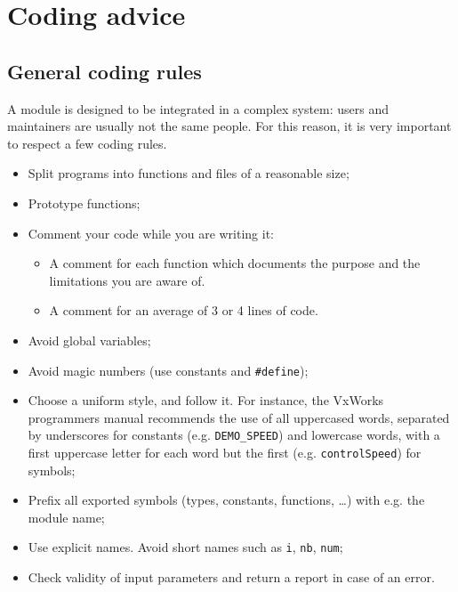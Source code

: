 \section{Coding advice}

\subsection{General coding rules}

A  module is designed  to be  integrated in a  complex system:  users and
maintainers are usually not the same people.  For this reason, it is very
important to respect a few coding rules.

\begin{itemize}
\item Split programs into functions and files of a reasonable size;

\item Prototype functions;

\item Comment your code while you are writing it: 
   \begin{itemize}
   \item A comment for each function which documents the purpose and the
	 limitations you are aware of.
   \item A comment for an average of 3 or 4 lines of code.
   \end{itemize}

\item Avoid global variables;

\item Avoid magic numbers (use constants and \texttt{\#define});

\item Choose a uniform style, and follow it. For instance, the VxWorks
      programmers manual recommends the use of 
all uppercased  words, separated by underscores  for constants (e.g. 
\texttt{DEMO\_SPEED}) and lowercase words, with a first uppercase letter for each
word but the first (e.g. \texttt{controlSpeed}) for symbols;

\item Prefix all exported symbols (types, constants, functions, \ldots)
with e.g. the module name;

\item Use explicit names. Avoid short names such as \texttt{i}, \texttt{nb},
\texttt{num};

\item Check validity of input parameters and return a report in case of
an error.
\end{itemize}


